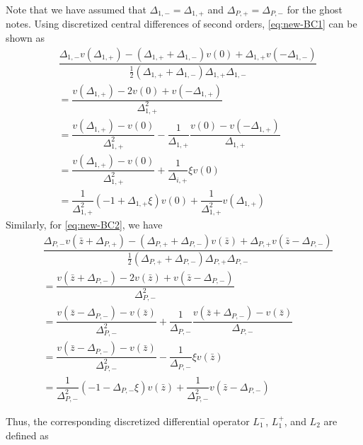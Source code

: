\documentclass[11pt]{article}
\begin{document}
Note that we have assumed that $\Delta_{1,-} = \Delta_{1,+}$ and $\Delta_{P,+} = \Delta_{P,-}$ for the ghost notes. Using discretized central differences of second orders, \eqref{eq:new-BC1} can be shown as
\begin{align}
&\dfrac{\Delta_{1,-} v( \Delta_{1,+}) - (\Delta_{1,+} + \Delta_{1,-}) v( 0 ) + \Delta_{1,+}  v( - \Delta_{1,-})}{\frac{1}{2}(\Delta_{1,+} + \Delta_{1,-}) \Delta_{1,+} \Delta_{1,-} } \\
&=
\dfrac{v (\Delta_{1, +}) - 2 v(0) + v(-\Delta_{1, +})}{\Delta_{1, +}^2} \\ &= \dfrac{v(\Delta_{1, +}) - v(0)}{\Delta_{1, +}^2} - \dfrac{1}{\Delta_{1, +}}\dfrac{v (0) - v(-\Delta_{1, +}) }{\Delta_{1, +}}  \\
&= \dfrac{v(\Delta_{1, +}) - v(0)}{\Delta_{1, +}^2} + \dfrac{1}{\Delta_{i,+}} \xi v(0)  \\ 
&= \dfrac{1}{\Delta_{1, +}^2}  (- 1 + \Delta_{1, +} \xi) v(0)  + \dfrac{1}{\Delta_{1, +}^2}  v(\Delta_{1, +})  
\end{align}
Similarly, for \eqref{eq:new-BC2}, we have
\begin{align}
&\dfrac{\Delta_{P,-} v( \bar{z} + \Delta_{P,+}) - (\Delta_{P,+} + \Delta_{P,-}) v(\bar{z} ) + \Delta_{P,+}  v( \bar{z} - \Delta_{P,-})}{\frac{1}{2}(\Delta_{P,+} + \Delta_{P,-}) \Delta_{P,+} \Delta_{P,-} } \\
&=\dfrac{v (\bar{z} + \Delta_{P,-}) - 2 v(\bar{z} ) + v(\bar{z} -\Delta_{P,-})}{\Delta_{P,-}^2} \\
&=   \dfrac{v(\bar{z} - \Delta_{P,-}) - v(\bar{z})}{\Delta_{P,-}^2} + \dfrac{1}{\Delta_{P,-}}\dfrac{ v(\bar{z}+\Delta_{P,-}) - v (\bar{z}) }{\Delta_{P,-}}  \\
&= \dfrac{v(\bar{z} - \Delta_{P,-}) - v(\bar{z})}{\Delta_{P,-}^2}  - \dfrac{1}{\Delta_{P,-}} \xi v(\bar{z})  \\ 
&= \dfrac{1}{\Delta_{P,-}^2}  (- 1 - \Delta_{P,-} \xi) v(\bar{z})  + \dfrac{1}{\Delta_{P,-}^2}  v(\bar{z} - \Delta_{P,-})  
\end{align}

Thus, the corresponding discretized differential operator $L_1^{-}$, $L_1^{+}$, and $L_2$ are defined as 
\end{document}

